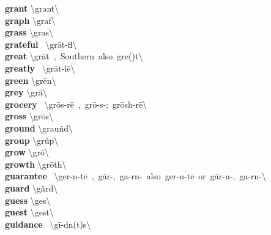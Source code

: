 \documentclass[10pt,a4paper]{article}
\begin{document}
\begin{multicols}{2}
\textbf{ grant }\quad \textbackslash \textprimstress grant\textbackslash \\
\textbf{ graph }\quad \textbackslash \textprimstress graf\textbackslash \\
\textbf{ grass }\quad \textbackslash \textprimstress gras\textbackslash \\
\textbf{ grateful }\quad \ \textbackslash \textprimstress gr\={a}t-f\textschwa l\textbackslash \\
\textbf{ great }\quad \textbackslash \textprimstress gr\={a}t\ ,\ Southern\ also\ \textprimstress gre(\textschwa )t\textbackslash \\
\textbf{ greatly }\quad \ \textbackslash \textprimstress gr\={a}t-l\={e}\textbackslash \\
\textbf{ green }\quad \textbackslash \textprimstress gr\={e}n\textbackslash \\
\textbf{ grey }\quad \textbackslash \textprimstress gr\={a}\textbackslash \\
\textbf{ grocery }\quad \ \textbackslash \textprimstress gr\={o}s-r\={e}\ ,\ \textprimstress gr\={o}-s\textschwa -;\ \textprimstress gr\={o}sh-r\={e}\textbackslash \\
\textbf{ gross }\quad \textbackslash \textprimstress gr\={o}s\textbackslash \\
\textbf{ ground }\quad \textbackslash \textprimstress grau\. nd\textbackslash \\
\textbf{ group }\quad \textbackslash \textprimstress gr\"{u}p\textbackslash \\
\textbf{ grow }\quad \textbackslash \textprimstress gr\={o}\textbackslash \\
\textbf{ growth }\quad \textbackslash \textprimstress gr\={o}th\textbackslash \\
\textbf{ guarantee }\quad \ \textbackslash \textsecstress ger-\textschwa n-\textprimstress t\={e}\ ,\ \textsecstress g\"{a}r-,\ \textsecstress ga-r\textschwa n-\ also\ \textprimstress ger-\textschwa n-\textsecstress t\={e}\ or\ \textprimstress g\"{a}r-\textschwa n-,\ \textprimstress ga-r\textschwa n-\textbackslash \\
\textbf{ guard }\quad \textbackslash \textprimstress g\"{a}rd\textbackslash \\
\textbf{ guess }\quad \textbackslash \textprimstress ges\textbackslash \\
\textbf{ guest }\quad \textbackslash \textprimstress gest\textbackslash \\
\textbf{ guidance }\quad \ \textbackslash \textprimstress g\={i}-d\textsuperscript{\textreve}n(t)s\textbackslash \\

\end{multicols}
\end{document}
